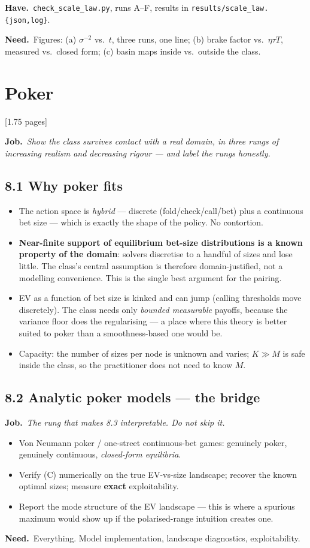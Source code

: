\documentclass[11pt]{article}
\newcommand{\job}[1]{\par\smallskip\noindent
  \textcolor{jobc}{\textbf{Job.}}\ \emph{#1}\par\smallskip}
\newcommand{\have}[1]{\par\noindent
  \textcolor{havec}{\textbf{Have.}}\ #1\par}
\newcommand{\need}[1]{\par\noindent
  \textcolor{needc}{\textbf{Need.}}\ #1\par}
\newcommand{\budget}[1]{\hfill{\small\textsf{[#1]}}}
\theoremstyle{definition}
\theoremstyle{remark}
\begin{document}
\have{\texttt{check\_scale\_law.py}, runs A--F, results in
\texttt{results/scale\_law.\{json,log\}}.}

\need{Figures: (a) $\sigma^{-2}$ vs.\ $t$, three runs, one line; (b) brake factor
vs.\ $\eta\tau T$, measured vs.\ closed form; (c) basin maps inside vs.\ outside
the class.}

\section{Poker}\label{sec:poker}
\budget{1.75 pages}

\job{Show the class survives contact with a real domain, in three rungs of
increasing realism and decreasing rigour --- and label the rungs honestly.}

\subsection*{8.1 Why poker fits}
\begin{itemize}[leftmargin=1.2em]
\item The action space is \emph{hybrid} --- discrete (fold/check/call/bet) plus a
  continuous bet size --- which is exactly the shape of the policy. No contortion.
\item \textbf{Near-finite support of equilibrium bet-size distributions is a known
  property of the domain}: solvers discretise to a handful of sizes and lose
  little. The class's central assumption is therefore domain-justified, not a
  modelling convenience. This is the single best argument for the pairing.
\item EV as a function of bet size is kinked and can jump (calling thresholds
  move discretely). The class needs only \emph{bounded measurable} payoffs,
  because the variance floor does the regularising --- a place where this theory
  is better suited to poker than a smoothness-based one would be.
\item Capacity: the number of sizes per node is unknown and varies; $K \gg M$ is
  safe inside the class, so the practitioner does not need to know $M$.
\end{itemize}

\subsection*{8.2 Analytic poker models --- the bridge}
\job{The rung that makes 8.3 interpretable. Do not skip it.}
\begin{itemize}[leftmargin=1.2em]
\item Von Neumann poker / one-street continuous-bet games: genuinely poker,
  genuinely continuous, \emph{closed-form equilibria}.
\item Verify (C) numerically on the true EV-vs-size landscape; recover the known
  optimal sizes; measure \textbf{exact} exploitability.
\item Report the mode structure of the EV landscape --- this is where a spurious
  maximum would show up if the polarised-range intuition creates one.
\end{itemize}
\need{Everything. Model implementation, landscape diagnostics, exploitability.}
\end{document}
